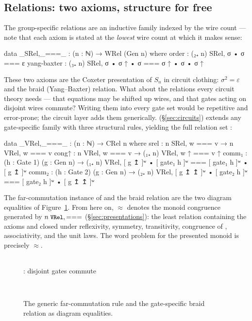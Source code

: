 \subsection{Relations: two axioms, structure for free}

The group-specific relations are an inductive family indexed by the wire
count --- note that each axiom is stated at the \emph{lowest} wire count at
which it makes sense:

\begin{agdacode}
data _SRel,_===_ : (n : ℕ) → WRel (Gen n) where
  order       : (₂₊ n) SRel, σ • σ === ε
  yang-baxter : (₃₊ n) SRel, σ • σ ↑ • σ === σ ↑ • σ • σ ↑
\end{agdacode}

These two axioms are the Coxeter presentation of $S_n$ in circuit clothing:
$\sigma^2 = \varepsilon$ and the braid (Yang--Baxter) relation.  What about
the relations every circuit theory needs --- that equations may be shifted
up wires, and that gates acting on disjoint wires commute?  Writing them
into every gate set would be repetitive and error-prone; the circuit layer
adds them generically.   (\S\ref{sec:circuits}) extends
any gate-specific family with three structural rules, yielding the full
relation set :

\begin{agdacode}
data _VRel,_===_ : (n : ℕ) → CRel n where
  srel  : n SRel, w === v → n VRel, w === v
  cong↑ : n VRel, w === v → (₁₊ n) VRel, w ↑ === v ↑
  comm₁ : (h : Gate 1) (g : Gen n) → (₁₊ n) VRel,
    [ g ↥ ]ʷ • [ gate₁ h ]ʷ === [ gate₁ h ]ʷ • [ g ↥ ]ʷ
  comm₂ : (h : Gate 2) (g : Gen n) → (₂₊ n) VRel,
    [ g ↥ ↥ ]ʷ • [ gate₂ h ]ʷ === [ gate₂ h ]ʷ • [ g ↥ ↥ ]ʷ
\end{agdacode}

The far-commutation instance of  and the braid relation are the
two diagram equalities of Figure~\ref{fig:relations}.  From here on,
$\approx$ denotes the monoid congruence generated by
$n\;\mbox{\texttt{\small VRel}},{=}{=}{=}$ (\S\ref{sec:presentations}): the least relation
containing the axioms and closed under reflexivity, symmetry, transitivity,
congruence of , associativity, and the unit laws.  The word problem
for the presented monoid is precisely $\approx$.

\begin{figure}[h]
\centering
\begin{minipage}[c]{0.41\linewidth}\centering
{}\\[2pt]
{\small {}: disjoint gates commute}
\end{minipage}\hfill
\begin{minipage}[c]{0.55\linewidth}\centering
{}\\[2pt]
{\small {}}
\end{minipage}
\caption{The generic far-commutation rule and the gate-specific braid
relation as diagram equalities.}
\label{fig:relations}
\end{figure}

